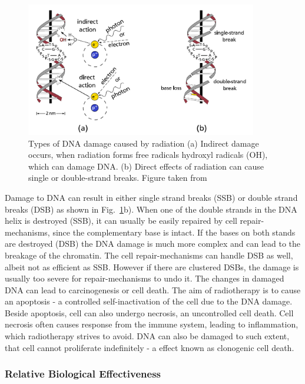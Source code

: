 \begin{figure}[H]
\begin{center}
\includegraphics[width=0.9\textwidth]{./Fundamentals/Images/SSB_DSB.png}
\caption{Types of DNA damage caused by radiation (a) Indirect damage occurs, when radiation forms free radicals hydroxyl radicals (OH), which can damage DNA. (b) Direct effects of radiation can cause single or double-strand breaks. 
Figure taken from \cite{Richter2012}}
\label{ida}
\end{center}
\end{figure}


Damage to DNA can result in either single strand breaks (SSB) or double strand breaks (DSB) as shown in Fig.~\ref{ida}b). When one of the double strands in the DNA helix is destroyed (SSB), it can usually be easily repaired by cell 
repair-mechanisms, since the complementary base is intact. If the bases on both stands are destroyed (DSB) the DNA damage is much more complex and can lead to the breakage of the chromatin. The cell repair-mechanisms can handle DSB as well, 
albeit not as efficient as SSB. However if there are clustered DSBs, the damage is usually too severe for repair-mechanisms to undo it. The changes in damaged DNA can lead to carcinogenesis or cell death. The aim of radiotherapy is to 
cause an apoptosis - a controlled self-inactivation of the cell due to the DNA damage. Beside apoptosis, cell can also undergo necrosis, an uncontrolled cell death. Cell necrosis often causes response from the immune system, leading to inflammation, which
radiotherapy strives to avoid. DNA can also be damaged to such extent, that cell cannot proliferate indefinitely - a effect known as clonogenic cell death.


\subsubsection{Relative Biological Effectiveness}
\label{RBE}

